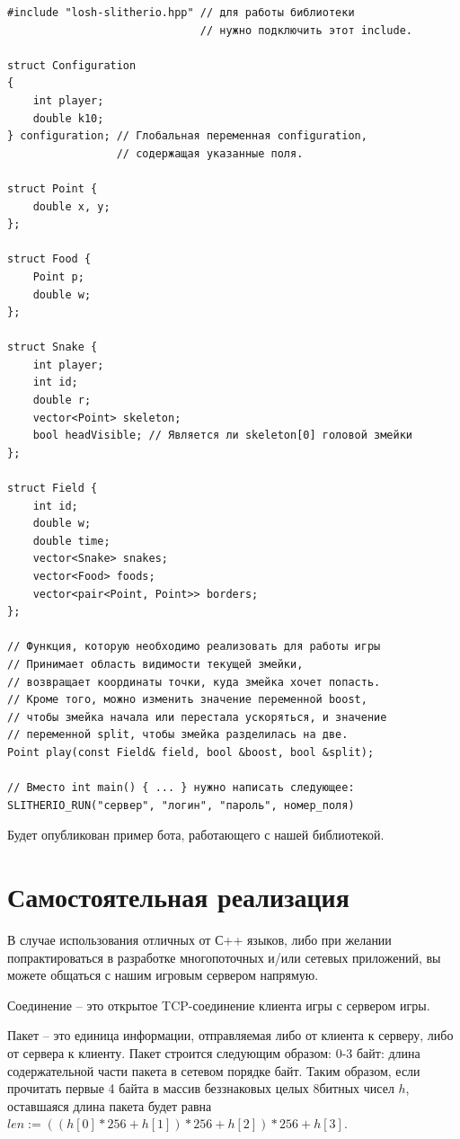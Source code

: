 \documentclass[12pt, a4paper]{article}
\begin{document}
\begin{verbatim}
#include "losh-slitherio.hpp" // для работы библиотеки
                              // нужно подключить этот include.

struct Configuration
{
	int player;
	double k10;
} configuration; // Глобальная переменная configuration,
                 // содержащая указанные поля.

struct Point {
    double x, y;
};

struct Food {
	Point p;
	double w;
};

struct Snake {
    int player;
    int id;
    double r;
    vector<Point> skeleton;
    bool headVisible; // Является ли skeleton[0] головой змейки
};

struct Field {
    int id;
    double w;
    double time;
    vector<Snake> snakes;
    vector<Food> foods;
    vector<pair<Point, Point>> borders;
};

// Функция, которую необходимо реализовать для работы игры
// Принимает область видимости текущей змейки,
// возвращает координаты точки, куда змейка хочет попасть.
// Кроме того, можно изменить значение переменной boost,
// чтобы змейка начала или перестала ускоряться, и значение 
// переменной split, чтобы змейка разделилась на две.
Point play(const Field& field, bool &boost, bool &split);

// Вместо int main() { ... } нужно написать следующее:
SLITHERIO_RUN("сервер", "логин", "пароль", номер_поля)
\end{verbatim}

Будет опубликован пример бота, работающего с нашей библиотекой.

{\section{Самостоятельная реализация}}

В случае использования отличных от С++ языков, либо при желании попрактироваться в разработке многопоточных и/или сетевых приложений, вы можете общаться с нашим игровым сервером напрямую.

Соединение -- это открытое TCP-соединение клиента игры с сервером игры.

Пакет -- это единица информации, отправляемая либо от клиента к серверу, либо от сервера к клиенту. Пакет строится следующим образом:
0-3 байт: длина содержательной части пакета в сетевом порядке байт. 
Таким образом, если прочитать первые 4 байта в массив беззнаковых целых 8битных чисел $h$, оставшаяся длина пакета будет равна $len := ((h[0] * 256 + h[1]) * 256 + h[2]) * 256 + h[3]$.
\end{document}
